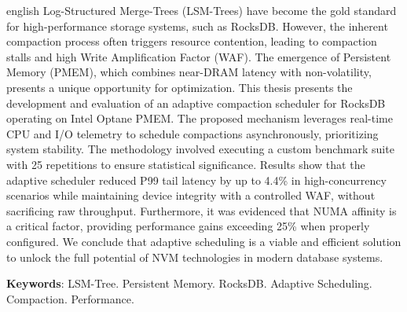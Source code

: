 \begin{resumo}[Abstract]
 \begin{otherlanguage*}{english}
 Log-Structured Merge-Trees (LSM-Trees) have become the gold standard for high-performance storage systems, such as RocksDB. However, the inherent compaction process often triggers resource contention, leading to compaction stalls and high Write Amplification Factor (WAF). The emergence of Persistent Memory (PMEM), which combines near-DRAM latency with non-volatility, presents a unique opportunity for optimization. This thesis presents the development and evaluation of an adaptive compaction scheduler for RocksDB operating on Intel Optane PMEM. The proposed mechanism leverages real-time CPU and I/O telemetry to schedule compactions asynchronously, prioritizing system stability. The methodology involved executing a custom benchmark suite with 25 repetitions to ensure statistical significance. Results show that the adaptive scheduler reduced P99 tail latency by up to 4.4\% in high-concurrency scenarios while maintaining device integrity with a controlled WAF, without sacrificing raw throughput. Furthermore, it was evidenced that NUMA affinity is a critical factor, providing performance gains exceeding 25\% when properly configured. We conclude that adaptive scheduling is a viable and efficient solution to unlock the full potential of NVM technologies in modern database systems.

   \vspace{\onelineskip}
 
   \noindent 
   \textbf{Keywords}: LSM-Tree. Persistent Memory. RocksDB. Adaptive Scheduling. Compaction. Performance.
 \end{otherlanguage*}
\end{resumo}